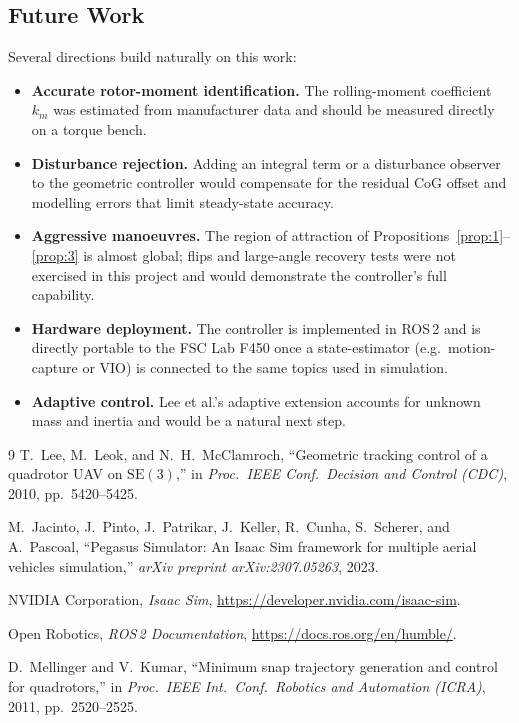 \documentclass[11pt]{article}
\theoremstyle{remark}
\begin{document}
\subsection{Future Work}
\label{sec:future-work}
Several directions build naturally on this work:
\begin{itemize}
    \item \textbf{Accurate rotor-moment identification.} The rolling-moment coefficient $k_m$ was estimated from manufacturer data and should be measured directly on a torque bench.
    \item \textbf{Disturbance rejection.} Adding an integral term or a disturbance observer to the geometric controller would compensate for the residual CoG offset and modelling errors that limit steady-state accuracy.
    \item \textbf{Aggressive manoeuvres.} The region of attraction of Propositions~\ref{prop:1}--\ref{prop:3} is almost global; flips and large-angle recovery tests were not exercised in this project and would demonstrate the controller's full capability.
    \item \textbf{Hardware deployment.} The controller is implemented in ROS\,2 and is directly portable to the FSC Lab F450 once a state-estimator (e.g.\ motion-capture or VIO) is connected to the same topics used in simulation.
    \item \textbf{Adaptive control.} Lee et al.'s adaptive extension accounts for unknown mass and inertia and would be a natural next step.
\end{itemize}

\begin{thebibliography}{9}
T.~Lee, M.~Leok, and N.~H.~McClamroch,
``Geometric tracking control of a quadrotor UAV on $\mathrm{SE}(3)$,''
in \emph{Proc.\ IEEE Conf.\ Decision and Control (CDC)}, 2010, pp.\ 5420--5425.

M.~Jacinto, J.~Pinto, J.~Patrikar, J.~Keller, R.~Cunha, S.~Scherer, and A.~Pascoal,
``Pegasus Simulator: An Isaac Sim framework for multiple aerial vehicles simulation,''
\emph{arXiv preprint arXiv:2307.05263}, 2023.

NVIDIA Corporation, \emph{Isaac Sim}, \url{https://developer.nvidia.com/isaac-sim}.

Open Robotics, \emph{ROS\,2 Documentation}, \url{https://docs.ros.org/en/humble/}.

D.~Mellinger and V.~Kumar,
``Minimum snap trajectory generation and control for quadrotors,''
in \emph{Proc.\ IEEE Int.\ Conf.\ Robotics and Automation (ICRA)}, 2011, pp.\ 2520--2525.
\end{thebibliography}
\end{document}
